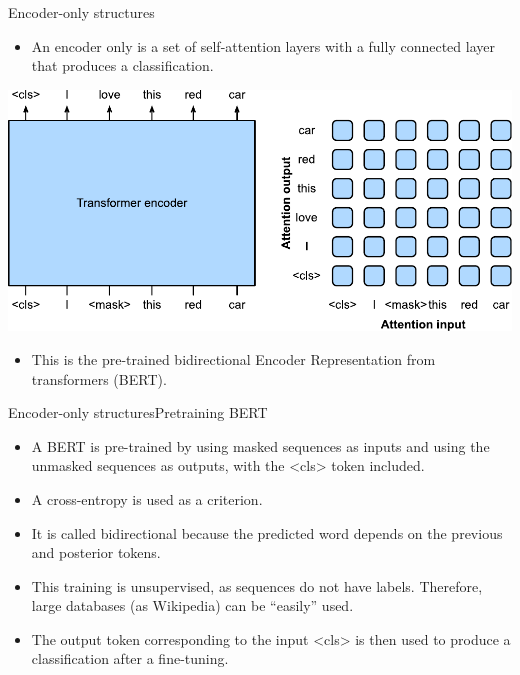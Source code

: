 \documentclass{beamer}
\begin{document}
\begin{frame}{Encoder-only structures}
\begin{itemize}
    \item An encoder only is a set of self-attention layers with a fully connected layer that produces a classification. 
\end{itemize}
\begin{center}
\includegraphics[scale=0.5]{Module 6 (Attention-based networks)/pics/bert-encoder-only.pdf}
\end{center}
\begin{itemize}
    \item This is the pre-trained bidirectional Encoder Representation from transformers (BERT). 
\end{itemize}
\end{frame}

\begin{frame}{Encoder-only structures}{Pretraining BERT}
\begin{itemize}
    \item A BERT is pre-trained by using masked sequences as inputs and using the unmasked sequences as outputs, with the <cls> token included. 
    \item A cross-entropy is used as a criterion. 
    \item It is called bidirectional because the predicted word depends on the previous and posterior tokens. 
    \item This training is unsupervised, as sequences do not have labels. Therefore, large databases (as Wikipedia) can be ``easily'' used.
    \item The output token corresponding to the input <cls> is then used to produce a classification after a fine-tuning. 
\end{itemize}    
\end{frame}
\end{document}
